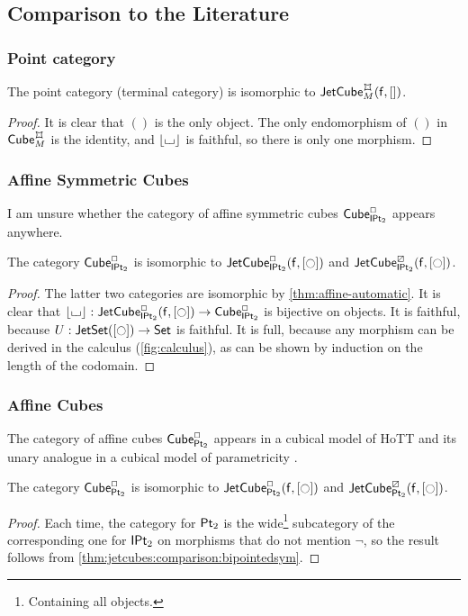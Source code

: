 \documentclass[a4paper]{memoir}
\begin{document}
\subsection{Comparison to the Literature} \label{sec:jetcubes:comparison}
\subsubsection{Point category}
\begin{proposition}
	The point category (terminal category) is isomorphic to $\jetcubefwd{\mycubex}{M}{[]}$.
\end{proposition}
\begin{proof}
	It is clear that $()$ is the only object.
	The only endomorphism of $()$ in $\cubecat^\mycubex_M$ is the identity, and $\mathopen{}\left\lfloor {\llcorner\hspace{-.4ex}\lrcorner} \right\rfloor\mathclose{}$ is faithful, so there is only one morphism.
\end{proof}

\subsubsection{Affine Symmetric Cubes}
I am unsure whether the category of affine symmetric cubes ${\mathsf{Cube}}_{\mathsf{IPt}_2}^\Box$ appears anywhere.
\begin{proposition} \label{thm:jetcubes:comparison:bipointedsym}
	The category ${\mathsf{Cube}}_{\mathsf{IPt}_2}^\Box$ is isomorphic to $\jetcubefwd{\affine}{\bipointedsym}{[\npolar]}$ and $\jetcubefwd{\cartes}{\bipointedsym}{[\npolar]}$.
\end{proposition}
\begin{proof}
	The latter two categories are isomorphic by \cref{thm:affine-automatic}.
	It is clear that $\erasejc{\loch} : \jetcubefwd{\affine}{\bipointedsym}{[\npolar]} \to \cubecat_\bipointedsym^\affine$ is bijective on objects.
	It is faithful, because $U : \jetset{[\npolar]} \to \Set$ is faithful.
	It is full, because any morphism can be derived in the calculus (\cref{fig:calculus}), as can be shown by induction on the length of the codomain.
\end{proof}

\subsubsection{Affine Cubes}
The category of affine cubes ${\mathsf{Cube}}_{\mathsf{Pt}_2}^\Box$ appears in a cubical model of HoTT \cite{bch} and its unary analogue in a cubical model of parametricity \cite{bcm}.
\begin{proposition} \label{thm:jetcubes:comparison:bipointed}
	The category ${\mathsf{Cube}}_{\mathsf{Pt}_2}^\Box$ is isomorphic to $\jetcubefwd{\affine}{\bipointed}{[\npolar]}$ and $\jetcubefwd{\cartes}{\bipointed}{[\npolar]}$.
\end{proposition}
\begin{proof}
	Each time, the category for ${\mathsf{Pt}_2}$ is the wide\footnote{Containing all objects.} subcategory of the corresponding one for ${\mathsf{IPt}_2}$ on morphisms that do not mention $\lnot$, so the result follows from \cref{thm:jetcubes:comparison:bipointedsym}.
\end{proof}
\end{document}
